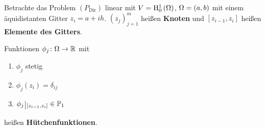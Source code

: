 Betrachte das Problem $\left(P_{\text{Dir}}\right)$ linear mit $V=\mathrm{H}^{1}_{0}\left(\Omega\right)$, $\Omega=\left(a,b\right)$ mit einem äquidistanten Gitter $z_{i} = a+ih$. $\left(z_{j}\right)_{j=1}^{m}$ heißen \textbf{Knoten} und $\left[z_{i-1},z_{i}\right]$ heißen \textbf{Elemente des Gitters}.
\begin{definition}
	Funktionen $\phi_{j}\colon\Omega\to\mathbb{R}$ mit
	\begin{enumerate}
		\item $\phi_{j}$ stetig
		\item $\phi_{j}\left(z_{i}\right) = \delta_{ij}$
		\item $\phi_{j}\einschraenkung_{\left[z_{i-1},z_{i}\right]}\in\mathbb{P}_{1}$
	\end{enumerate}
	\vspace*{0.5em}heißen \textbf{Hütchenfunktionen}.
\end{definition}
